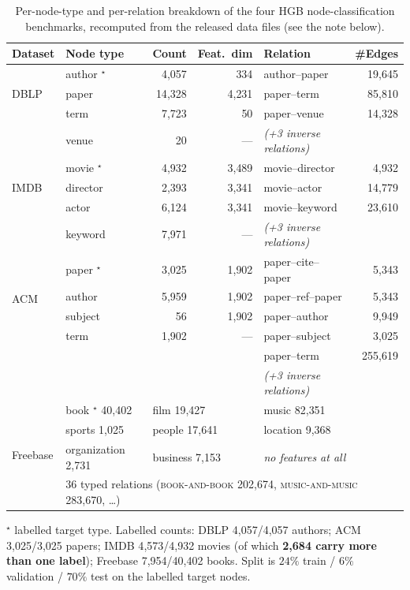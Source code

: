 \begin{table}[htbp]
\centering
\small
\caption{Per-node-type and per-relation breakdown of the four HGB node-classification
benchmarks, recomputed from the released data files (see the note below).}
\label{p2:tab:hgbdetail}
\begin{tabular}{llrrlr}
\toprule
Dataset & Node type & Count & Feat.\ dim & Relation & \#Edges \\
\midrule
\multirow{3}{*}{DBLP}
 & author $^{\star}$ & 4{,}057  & 334   & author--paper & 19{,}645 \\
 & paper             & 14{,}328 & 4{,}231 & paper--term  & 85{,}810 \\
 & term              & 7{,}723  & 50    & paper--venue  & 14{,}328 \\
 & venue             & 20       & ---   & \emph{(+3 inverse relations)} & \\
\midrule
\multirow{3}{*}{IMDB}
 & movie $^{\star}$  & 4{,}932  & 3{,}489 & movie--director & 4{,}932 \\
 & director          & 2{,}393  & 3{,}341 & movie--actor    & 14{,}779 \\
 & actor             & 6{,}124  & 3{,}341 & movie--keyword  & 23{,}610 \\
 & keyword           & 7{,}971  & ---   & \emph{(+3 inverse relations)} & \\
\midrule
\multirow{4}{*}{ACM}
 & paper $^{\star}$  & 3{,}025  & 1{,}902 & paper--cite--paper & 5{,}343 \\
 & author            & 5{,}959  & 1{,}902 & paper--ref--paper  & 5{,}343 \\
 & subject           & 56       & 1{,}902 & paper--author      & 9{,}949 \\
 & term              & 1{,}902  & ---   & paper--subject     & 3{,}025 \\
 &                   &          &       & paper--term        & 255{,}619 \\
 &                   &          &       & \emph{(+3 inverse relations)} & \\
\midrule
\multirow{4}{*}{Freebase}
 & book $^{\star}$ 40{,}402 & \multicolumn{2}{l}{film 19{,}427} & \multicolumn{2}{l}{music 82{,}351} \\
 & sports 1{,}025 & \multicolumn{2}{l}{people 17{,}641} & \multicolumn{2}{l}{location 9{,}368} \\
 & organization 2{,}731 & \multicolumn{2}{l}{business 7{,}153} & \multicolumn{2}{l}{\emph{no features at all}} \\
 & \multicolumn{5}{l}{36 typed relations (\textsc{book-and-book} 202{,}674,
   \textsc{music-and-music} 283{,}670, \dots)} \\
\bottomrule
\end{tabular}

\vspace{2pt}
{\footnotesize $^{\star}$ labelled target type. Labelled counts: DBLP 4{,}057/4{,}057 authors;
ACM 3{,}025/3{,}025 papers; IMDB 4{,}573/4{,}932 movies (of which \textbf{2{,}684 carry more than
one label}); Freebase 7{,}954/40{,}402 books. Split is $24\%$ train / $6\%$ validation / $70\%$
test on the labelled target nodes.}
\end{table}

